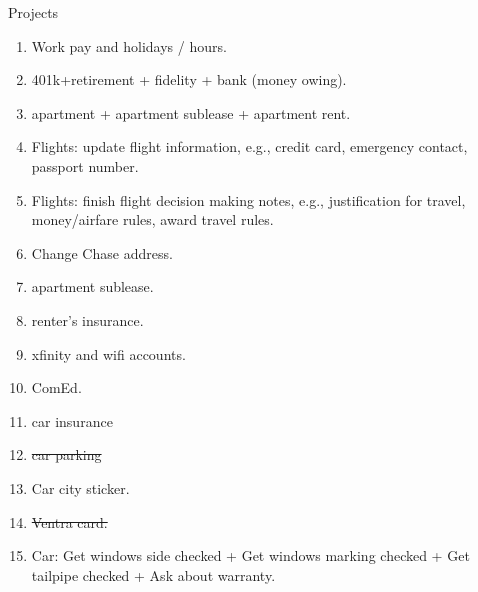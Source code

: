 \documentclass[serif, mathserif, final]{beamer}
\newcommand{\doneTask}[1]{\tiny \item \tiny \sout{#1}}
\begin{document}
\begin{frame}
\begin{columns}
\begin{column}{0.5\textwidth}
\begin{block}{Projects}
\begin{enumerate}
\item \tiny Work pay and holidays / hours. 
\item \tiny 401k+retirement  + fidelity + bank (money owing). 
\item \tiny apartment + apartment sublease + apartment rent.
\item \tiny Flights: update flight information, e.g., credit card,
  emergency contact, passport number.
\item \tiny Flights: finish flight decision making notes, e.g.,
  justification for travel, money/airfare rules, award travel rules.
\item \tiny Change Chase address. 
\item \tiny apartment sublease. 
\item \tiny renter's insurance. 
\item \tiny xfinity and wifi accounts. 
\item \tiny ComEd. 
\item \tiny car insurance \doneTask{car parking} 
\item \tiny Car city sticker. \doneTask{Ventra card.}
\item \tiny Car: Get windows side checked + Get windows marking checked + Get tailpipe checked + Ask about warranty. 
\end{enumerate}


\end{block}
\end{column}
\end{columns}
\end{frame}
\end{document}
